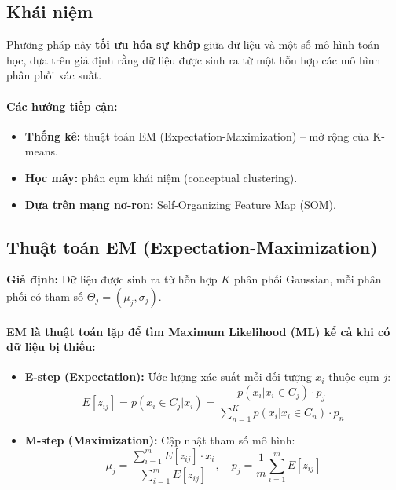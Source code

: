 \documentclass[10pt]{article}
\begin{document}
\subsection{Khái niệm}

Phương pháp này \textbf{tối ưu hóa sự khớp} giữa dữ liệu và một số mô hình toán học, dựa trên giả định rằng dữ liệu được sinh ra từ một hỗn hợp các mô hình phân phối xác suất.

\paragraph{Các hướng tiếp cận:}
\begin{itemize}
    \item \textbf{Thống kê:} thuật toán EM (Expectation-Maximization) -- mở rộng của K-means.
    \item \textbf{Học máy:} phân cụm khái niệm (conceptual clustering).
    \item \textbf{Dựa trên mạng nơ-ron:} Self-Organizing Feature Map (SOM).
\end{itemize}

\subsection{Thuật toán EM (Expectation-Maximization)}

\textbf{Giả định:} Dữ liệu được sinh ra từ hỗn hợp $K$ phân phối Gaussian, mỗi phân phối có tham số $\Theta_j = (\mu_j, \sigma_j)$.

\paragraph{EM là thuật toán lặp để tìm Maximum Likelihood (ML) kể cả khi có dữ liệu bị thiếu:}

\begin{itemize}
    \item \textbf{E-step (Expectation):} Ước lượng xác suất mỗi đối tượng $x_i$ thuộc cụm $j$:
    \[
    E[z_{ij}] = p(x_i \in C_j | x_i) = \frac{p(x_i | x_i \in C_j) \cdot p_j}{\sum_{n=1}^{K} p(x_i | x_i \in C_n) \cdot p_n}
    \]
    \item \textbf{M-step (Maximization):} Cập nhật tham số mô hình:
    \[
    \mu_j = \frac{\sum_{i=1}^{m} E[z_{ij}] \cdot x_i}{\sum_{i=1}^{m} E[z_{ij}]}, \quad p_j = \frac{1}{m}\sum_{i=1}^{m} E[z_{ij}]
    \]
\end{itemize}
\end{document}
